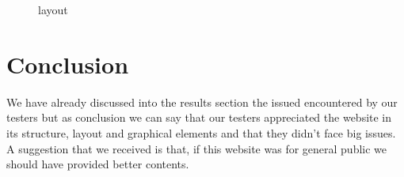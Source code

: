\documentclass[11pt, a4paperm, hidelinks]{article}
\begin{document}
\begin{figure}[h!]
\begin{minipage}[b]{0.4\textwidth}
		\caption{layout}
	\end{minipage}
	\end{figure}
	\FloatBarrier



	\section{Conclusion}	
 	We have already discussed into the results section the issued encountered by our testers but as conclusion we can say that 		our testers appreciated the website in its structure, layout and graphical elements and that they didn't face big issues. A 			suggestion that we received is that, if this website was for general public we should have provided better contents.
	\clearpage
\end{document}
